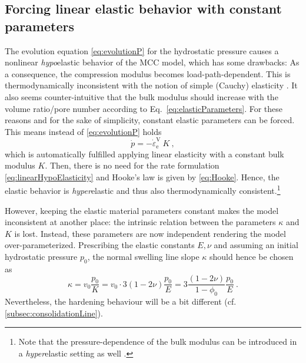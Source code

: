 \documentclass[paper=a4, twoside, pagesize]{scrartcl}
\newcommand{\e}{\text{e}}
\begin{document}
\subsection{Forcing linear elastic behavior with constant parameters}\label{subsec:linear_elastic}

The evolution equation \eqref{eq:evolutionP} for the hydrostatic pressure causes a nonlinear \emph{hypo}elastic behavior of the MCC model, which has some drawbacks:
As a consequence, the compression modulus becomes load-path-dependent.
This is thermodynamically inconsistent with the notion of simple (Cauchy) elasticity \cite{Borja1998}. It also seems counter-intuitive that the bulk modulus should increase with the volume ratio/pore number according to Eq.~\eqref{eq:elasticParameters}. For these reasons and for the sake of simplicity, constant elastic parameters can be forced. This means instead of \eqref{eq:evolutionP} holds 
\begin{equation}\label{eq:constK}
  \dot{p} = -\dot{\varepsilon}_\e^\text{V}\ K \ ,
\end{equation}
which is automatically fulfilled applying linear elasticity with a constant bulk modulus $K$. Then, there is no need for the rate formulation \eqref{eq:linearHypoElasticity} and Hooke's law is given by \eqref{eq:Hooke}. Hence, the elastic behavior is \emph{hyper}elastic and thus also thermodynamically consistent.\footnote{Note that the pressure-dependence of the bulk modulus can be introduced in a \emph{hyper}elastic setting as well \cite{Houlsby1985}.}
\par
However, keeping the elastic material parameters constant makes the model inconsistent at another place: the intrinsic relation between the parameters $\kappa$ and $K$ is lost. Instead,
these parameters are now independent rendering the model over-parameterized. Prescribing the elastic constants $E, \nu$ and assuming an initial hydrostatic pressure $p_0$, the normal swelling line slope $\kappa$ should hence be chosen as
\begin{equation}\label{eq:relationE-kappa}
  \kappa = v_0\frac{p_0}{K} = v_0\cdot 3(1-2\nu) \frac{p_0}{E}
         = 3 \frac{(1-2\nu)}{1-\phi_0} \frac{p_0}{E}\ .
\end{equation}
Nevertheless, the hardening behaviour will be a bit different (cf. \autoref{subsec:consolidationLine}). 
\end{document}
